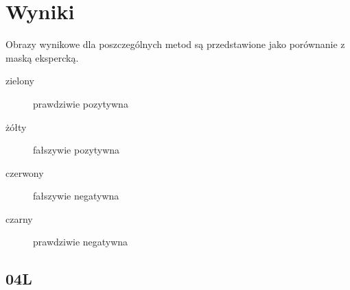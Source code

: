 \documentclass[polish,polish,a4paper]{article}
\begin{document}
	\section{Wyniki}
		Obrazy wynikowe dla poszczególnych metod są przedstawione jako porównanie z maską ekspercką.
		\begin{description}
			\item [zielony] prawdziwie pozytywna
			\item [żółty] fałszywie pozytywna
			\item [czerwony] fałszywie negatywna
			\item [czarny] prawdziwie negatywna
		\end{description}
\newpage
	
		\subsection{04L}
\end{document}
